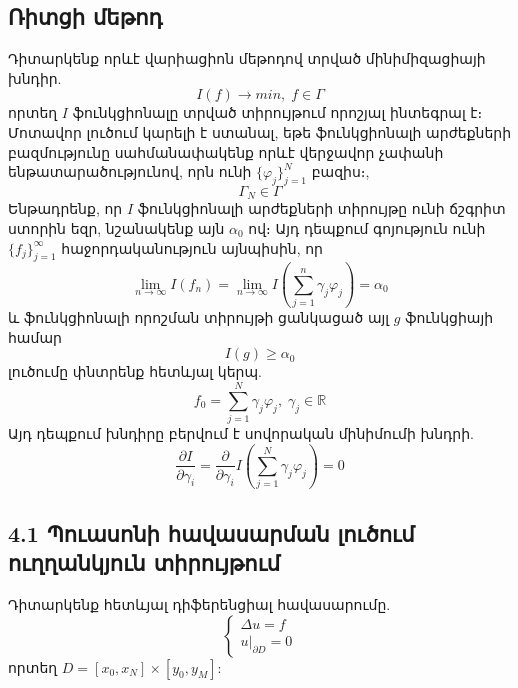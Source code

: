 \documentclass[fleqn, bachelor,subf,12pt,notitlepage]{article}
\begin{document}
\subsection*{Ռիտցի մեթոդ}
Դիտարկենք որևէ վարիացիոն մեթոդով տրված մինիմիզացիայի խնդիր.
		$$I\left(f\right) \longrightarrow min, \; f \in \Gamma$$
որտեղ $I$ ֆունկցիոնալը տրված տիրույթում որոշյալ ինտեգրալ է։
Մոտավոր լուծում կարելի է ստանալ, եթե ֆունկցիոնալի արժեքների բազմությունը սահմանափակենք որևէ վերջավոր չափանի ենթատարածությունով, որն ունի $\{\varphi_{j}\}_{j=1}^{N}$ բազիս։, 
			  $$\Gamma_{N} \in \Gamma $$
Ենթադրենք, որ $I$ ֆունկցիոնալի արժեքների տիրույթը ունի ճշգրիտ ստորին եզր, նշանակենք այն $\alpha_{0}$ ով։
Այդ դեպքում գոյություն ունի $\{f_{j}\}_{j=1}^{\infty}$ հաջորդականություն այնպիսին, որ
\begin{equation}
\lim_{n \to \infty}I\left(f_{n}\right) = \lim_{n \to \infty}I\left( \sum_{j=1}^{n} \gamma_{j}\varphi_{j} \right) = \alpha_{0}
\end{equation}
և ֆունկցիոնալի որոշման տիրույթի ցանկացած այլ $g$ ֆունկցիայի համար
			$$I\left(g\right) \geq \alpha_{0}$$
լուծումը փնտրենք հետևյալ կերպ.
\begin{equation}
f_{0}=\sum_{j=1}^{N}\gamma_{j}\varphi_{j}, \; \gamma_{j} \in \mathbb{R}
\end{equation}
Այդ դեպքում խնդիրը բերվում է սովորական մինիմումի խնդրի.
\begin{equation}
\dfrac{\partial I}{\partial \gamma_{i}} = \dfrac{\partial}{\partial \gamma_{i}} I \left(\sum_{j=1}^{N}\gamma_{j}\varphi_{j}\right) = 0
\end{equation}
\newpage
\subsection*{4.1 Պուասոնի հավասարման լուծում ուղղանկյուն տիրույթում}

Դիտարկենք հետևյալ դիֆերենցիալ հավասարումը.
\begin{equation}
\begin{cases}
			\Delta u =f \\
			u \Big |_{\partial D} = 0
\end{cases}
\end{equation}
որտեղ $D = \left[x_{0}, x_{N}\right] \times \left[y_{0}, y_{M}\right]$:
\end{document}
